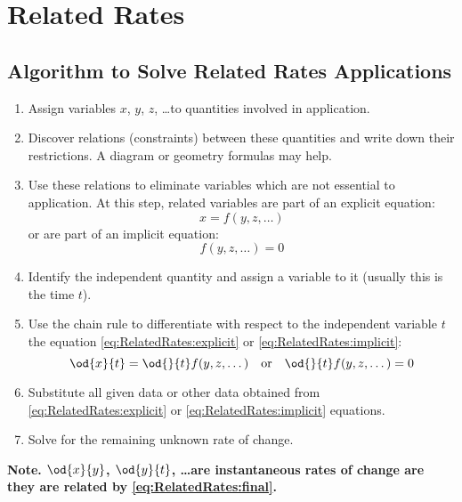 \section{Related Rates}
\subsection{Algorithm to Solve Related Rates Applications}
	\begin{enumerate}
		\item Assign variables $x$, $y$, $z$, \dots to quantities involved in application.
		\item Discover relations (constraints) between these quantities and write down their restrictions. A diagram or geometry formulas may help.
		\item Use these relations to eliminate variables which are not essential to application.
			At this step, related variables are part of an explicit equation:
			\begin{equation}\label{eq:RelatedRates:explicit}
				x = f(y,z,\dots)
			\end{equation}
			or are part of an implicit equation:
			\begin{equation}\label{eq:RelatedRates:implicit}
				f(y,z,\dots) = 0
			\end{equation}
		\item Identify the independent quantity and assign a variable to it (usually this is the time $t$).
		\item Use the chain rule to differentiate with respect to the independent variable $t$ the equation \eqref{eq:RelatedRates:explicit} or \eqref{eq:RelatedRates:implicit}:
			\begin{equation}\label{eq:RelatedRates:final}
				\od{x}{t} = \od{}{t} f(y,z,\dots) \quad \text{or} \quad \od{}{t}f(y,z,\dots) = 0
			\end{equation}
		\item Substitute all given data or other data obtained from \eqref{eq:RelatedRates:explicit} or \eqref{eq:RelatedRates:implicit} equations.
		\item Solve for the remaining unknown rate of change.
	\end{enumerate}
	\textbf{Note. $\od{x}{y}$, $\od{y}{t}$, \dots are instantaneous rates of change are they are related by \eqref{eq:RelatedRates:final}.}
